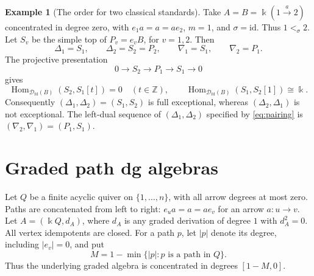 \documentclass[11pt,a4paper]{article}
\newcommand{\D}{\mathcal D}
\newcommand{\ZZ}{\mathbb{Z}}
\newcommand{\std}{\Delta}
\newcommand{\costd}{\nabla}
\DeclareMathOperator{\fd}{fd}
\DeclareMathOperator{\Hom}{Hom}
\theoremstyle{plain}
\theoremstyle{definition}
\newtheorem{example}[theorem]{Example}
\numberwithin{equation}{section}
\begin{document}
\begin{example}[The order for two classical standards]\label{ex:classical-order}
Take $A=B=\Bbbk(1\xrightarrow{a}2)$ concentrated in degree zero,
with $e_1a=a=ae_2$, $m=1$, and $\sigma=\mathrm{id}$. Thus $1<_\sigma2$.
Let $S_v$ be the simple top of $P_v=e_vB$, for $v=1,2$. Then
\begin{equation}\label{eq:classical-order-objects}
 \std_1=S_1,\qquad \std_2=S_2=P_2,\qquad
 \costd_1=S_1,\qquad \costd_2=P_1.
\end{equation}
The projective presentation
\begin{equation}\label{eq:classical-order-extension}
 0\longrightarrow S_2\longrightarrow P_1\longrightarrow S_1
 \longrightarrow0
\end{equation}
gives
\begin{equation}\label{eq:classical-order-hom}
 \Hom_{\D_{\fd}(B)}(S_2,S_1[t])=0\quad(t\in\ZZ),\qquad
 \Hom_{\D_{\fd}(B)}(S_1,S_2[1])\cong\Bbbk.
\end{equation}
Consequently $(\std_1,\std_2)=(S_1,S_2)$ is full exceptional,
whereas $(\std_2,\std_1)$ is not exceptional. The left-dual sequence
of $(\std_1,\std_2)$ specified by \eqref{eq:pairing} is
$(\costd_2,\costd_1)=(P_1,S_1)$.
\end{example}

\section{Graded path dg algebras}\label{sec:paths}

Let $Q$ be a finite acyclic quiver on $\{1,\ldots,n\}$, with all arrow
degrees at most zero. Paths are concatenated from left to right:
$e_ua=a=ae_v$ for an arrow $a:u\to v$. Let
$A=(\Bbbk Q,d_A)$, where $d_A$ is any graded derivation of degree $1$
with $d_A^2=0$. All vertex idempotents are closed. For a path $p$, let
$|p|$ denote its degree, including $|e_v|=0$, and put
\begin{equation}\label{eq:path-width}
 M=1-\min\{|p|:p\text{ is a path in }Q\}.
\end{equation}
Thus the underlying graded algebra is concentrated in degrees
$[1-M,0]$.
\end{document}
